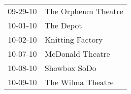 \begin{supertabular}{p{0.07\textwidth}p{0.23\textwidth}}
 09-29-10 &  The Orpheum Theatre \\
 10-01-10 &            The Depot \\
 10-02-10 &     Knitting Factory \\
 10-07-10 &     McDonald Theatre \\
 10-08-10 &         Showbox SoDo \\
 10-09-10 &    The Wilma Theatre \\
\end{supertabular}
